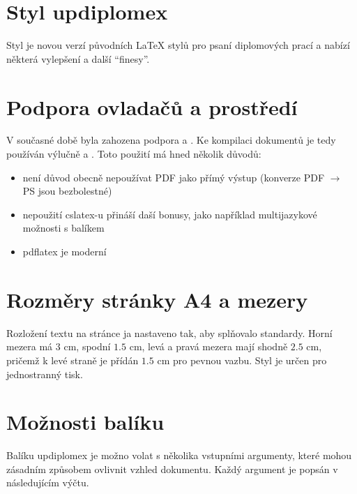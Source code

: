 \documentclass[a4paper,12pt]{article}
\begin{document}
\upmaketitle

\upthanksanot

\uptocandlists

\section{Styl updiplomex}
Styl  je novou verzí původních \LaTeX{} stylů pro psaní diplomových prací a nabízí některá vylepšení a další \enquote{finesy}.


\section{Podpora ovladačů a prostředí}
V současné době byla zahozena podpora  a . Ke kompilaci dokumentů je tedy používán výlučně  a . Toto použití má hned několik důvodů:
\begin{itemize}
\item není důvod obecně nepoužívat PDF jako přímý výstup (konverze PDF $\rightarrow$ PS jsou bezbolestné)
\item nepoužití cslatex-u přináší daší bonusy, jako například multijazykové možnosti s balíkem 
\item pdflatex je moderní
\end{itemize}

\section{Rozměry stránky A4 a mezery}
Rozložení textu na stránce ja nastaveno tak, aby splňovalo standardy. Horní mezera má $3$ cm, spodní $1.5$ cm, levá a pravá mezera mají shodně $2.5$ cm, pričemž k levé straně je přídán $1.5$ cm pro pevnou vazbu. Styl je určen pro jednostranný tisk.

\section{Možnosti balíku}
Balíku updiplomex je možno volat s několika vstupními argumenty, které mohou zásadním způsobem ovlivnit vzhled dokumentu. Každý argument je popsán v následujícím výčtu.
\end{document}
